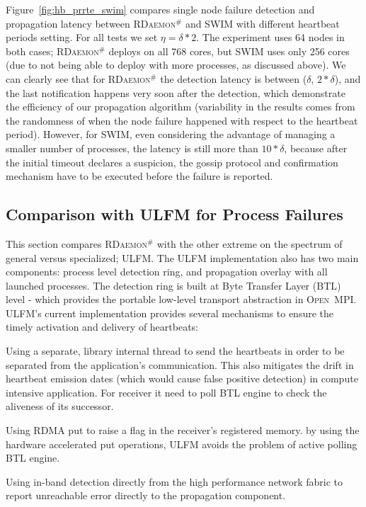 \documentclass[sigconf]{acmart}
\newcommand{\ompi}[0]{\textsc{Open~MPI}\xspace}
\newcommand{\ulfm}[0]{\textsc{ULFM}\xspace}
\newcommand{\ourwork}[0]{\textsc{RDaemon}\ensuremath{^\#}\xspace}
\begin{document}
Figure~\ref{fig:hb_prrte_swim} compares single node failure detection and propagation latency between \ourwork and SWIM 
with different heartbeat periods setting. For all tests we set $ \eta = \delta * 2 $. The 
experiment uses 64 nodes in both cases; \ourwork deploys on all 768 cores, but SWIM uses only 
256 cores (due to not being able to deploy with more processes, as discussed above).
 We can clearly see that for \ourwork the detection latency is between ($\delta$, $2*\delta$), and the last notification happens very soon after the detection, which demonstrate the efficiency of our propagation algorithm (variability in the results comes from the randomness of when the node failure happened with respect to the heartbeat period). However, for SWIM, even considering the advantage of managing a 
 smaller number of processes, the latency is still more than $10*\delta$, because after the initial timeout declares a suspicion, the gossip protocol and confirmation mechanism have to be executed
before the failure is reported.

\subsection{Comparison with \ulfm for Process Failures}
This section compares \ourwork with the other extreme on the spectrum of
general versus specialized; \ulfm. The \ulfm implementation also has two
 main components: process level detection ring, and propagation overlay with all launched processes. The detection ring is built at Byte Transfer Layer (BTL) level - which provides the portable low-level transport abstraction in \ompi. \ulfm's current implementation provides several mechanisms to ensure the timely activation and delivery of heartbeats:
\begin{compactenum}
  \item Using a separate, library internal thread to send the heartbeats in order to be separated from the application's communication. This also mitigates the drift in heartbeat
  emission dates (which would cause false positive detection) in compute intensive application.
  For receiver it need to poll BTL engine to check the aliveness of its successor.
  \item Using RDMA put to raise a flag in the receiver's registered memory. by using the hardware accelerated put operations, \ulfm avoids the problem of active polling BTL engine.
  \item Using in-band detection directly from the high performance network
  fabric to report unreachable error directly to the propagation component.
\end{compactenum}
\end{document}
